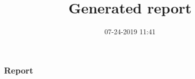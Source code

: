 \documentclass[slidestop]{beamer}
\numberwithin{equation}{section}
\begin{document}

\part{ }


\title[CIRL Generated Report]{Generated report}

\author{}

\institute{}

\date{07-24-2019 11:41}

\frame{\titlepage}

\section{Report}
\end{document}
